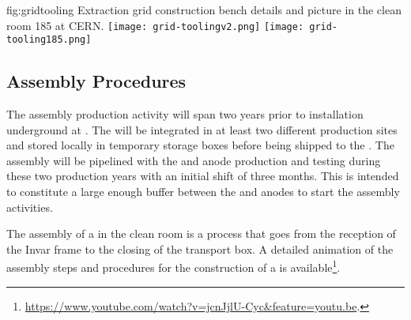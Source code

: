 \begin{dunefigure}{fig:gridtooling}
{Extraction grid construction bench details and picture in the clean room 185 at CERN.}
\texttt{[image: grid-toolingv2.png]}
\texttt{[image: grid-tooling185.png]}
\end{dunefigure}

\subsection{Assembly Procedures}
\label{sec:fddp-crp-assy}

The  assembly production activity will span two years 
prior to  installation underground at \surf. The  will be integrated in at least two different production sites and stored locally in temporary storage boxes before being shipped to the . %
The  assembly will be pipelined with the  and anode production and testing during these two production years with an initial  shift of three months. This is intended to constitute a large enough buffer between the  and anodes to start the  assembly activities.

The assembly of a  in the clean room is a process that goes from the reception of the Invar frame to the  closing of the transport box. 
A detailed animation of the assembly steps and procedures for the construction of a   is available\footnote{\url{https://www.youtube.com/watch?v=jcnJjlU-Cyc&feature=youtu.be}.}.

